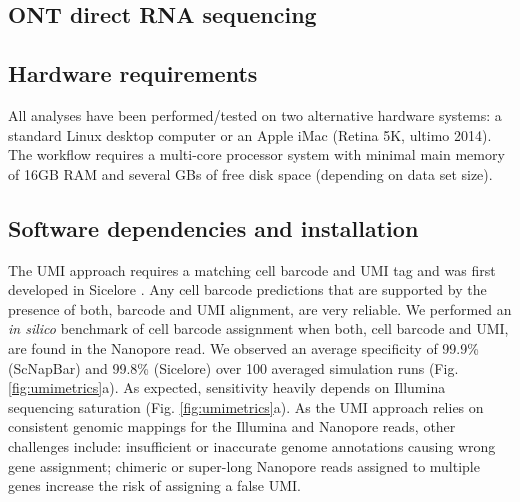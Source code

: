 \documentclass[times, 11pt, a4paper]{article}
\begin{document}
\subsection*{ONT direct RNA sequencing}

\subsection*{Hardware requirements}
All analyses have been performed/tested on two alternative hardware systems:
a standard Linux desktop computer or an Apple iMac (Retina 5K, ultimo 2014).
The workflow requires a multi-core processor system with minimal main memory of 16GB RAM
and several GBs of free disk space (depending on data set size).

\subsection*{Software dependencies and installation}
The UMI approach requires a matching cell barcode and UMI tag and was first developed in Sicelore . Any cell barcode predictions that are supported by the presence of both, barcode and UMI alignment, are very reliable. We performed an \emph{in silico} benchmark of cell barcode assignment when both, cell barcode and UMI,  are found in the Nanopore read. We observed an average specificity of 99.9\% (ScNapBar) and 99.8\% (Sicelore) over 100 averaged simulation runs (Fig. \ref{fig:umimetrics}a). As expected, sensitivity heavily depends on Illumina sequencing saturation (Fig. \ref{fig:umimetrics}a). As the UMI approach relies on consistent genomic mappings for the Illumina and Nanopore reads, other challenges include: insufficient or inaccurate genome annotations causing wrong gene assignment; chimeric or super-long Nanopore reads assigned to multiple genes increase the risk of assigning a false UMI. %
\end{document}
